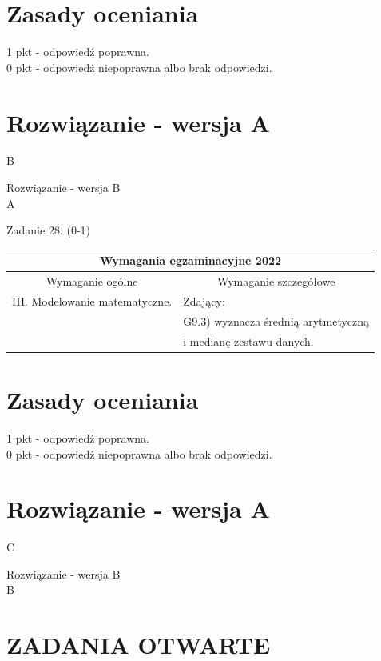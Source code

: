 \documentclass[10pt]{article}
\begin{document}
\section*{Zasady oceniania}
1 pkt - odpowiedź poprawna.\\
0 pkt - odpowiedź niepoprawna albo brak odpowiedzi.

\section*{Rozwiązanie - wersja A}
B

Rozwiązanie - wersja B\\
A

Zadanie 28. (0-1)

\begin{center}
\begin{tabular}{|l|l|}
\hline
\multicolumn{2}{|c|}{Wymagania egzaminacyjne 2022} \\
\hline
\multicolumn{1}{|c|}{Wymaganie ogólne} & \multicolumn{1}{c|}{Wymaganie szczegółowe} \\
\hline
III. Modelowanie matematyczne. & Zdający: \\
 & G9.3) wyznacza średnią arytmetyczną \\
 & i medianę zestawu danych. \\
\hline
\end{tabular}
\end{center}

\section*{Zasady oceniania}
1 pkt - odpowiedź poprawna.\\
0 pkt - odpowiedź niepoprawna albo brak odpowiedzi.

\section*{Rozwiązanie - wersja A}
C

Rozwiązanie - wersja B\\
B

\section*{ZADANIA OTWARTE}
\end{document}
